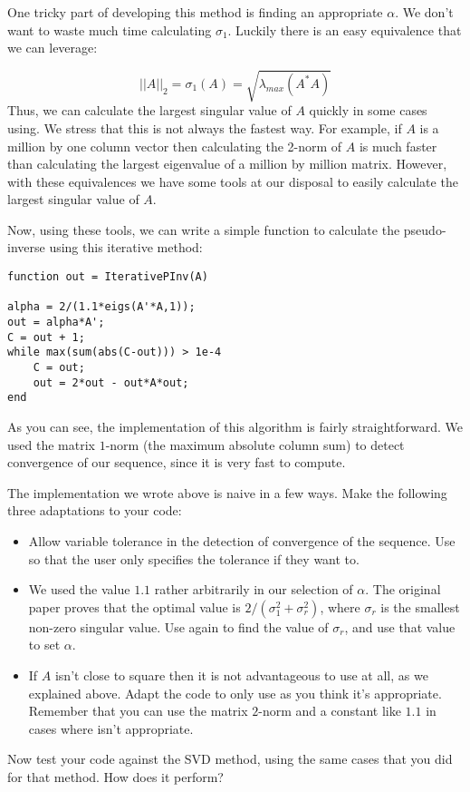 One tricky part of developing this method is finding an appropriate $\alpha$. We don't want to waste much time calculating $\sigma_1$. Luckily there is an easy equivalence that we can leverage:

\[
||A||_2 = \sigma_1(A) = \sqrt{\lambda_{max} (A^* A)}
\]
Thus, we can calculate the largest singular value of $A$ quickly in some cases using. We stress that this is not always the fastest way. For example, if $A$ is a million by one column vector then calculating the 2-norm of $A$ is much faster than calculating the largest eigenvalue of a million by million matrix. However, with these equivalences we have some tools at our disposal to easily calculate the largest singular value of $A$.

Now, using these tools, we can write a simple function to calculate the pseudo-inverse using this iterative method:

\begin{lstlisting}
function out = IterativePInv(A)

alpha = 2/(1.1*eigs(A'*A,1));
out = alpha*A';
C = out + 1;
while max(sum(abs(C-out))) > 1e-4
    C = out;
    out = 2*out - out*A*out;
end
\end{lstlisting}
As you can see, the implementation of this algorithm is fairly straightforward. We used the matrix $1$-norm (the maximum absolute column sum) to detect convergence of our sequence, since it is very fast to compute.

\begin{problem}
The implementation we wrote above is naive in a few ways. Make the following three adaptations to your code:
\begin{itemize}
\item Allow variable tolerance in the detection of convergence of the sequence. Use  so that the user only specifies the tolerance if they want to.
\item We used the value $1.1$ rather arbitrarily in our selection of $\alpha$. The original paper proves that the optimal value is $2/(\sigma_1^2 + \sigma_r^2)$, where $\sigma_r$ is the smallest non-zero singular value. Use again to find the value of $\sigma_r$, and use that value to set $\alpha$.
\item If $A$ isn't close to square then it is not advantageous to use at all, as we explained above. Adapt the code to only use  as you think it's appropriate. Remember that you can use the matrix $2$-norm and a constant like $1.1$ in cases where  isn't appropriate.
\end{itemize}

Now test your code against the SVD method, using the same cases that you did for that method. How does it perform?
\end{problem}

